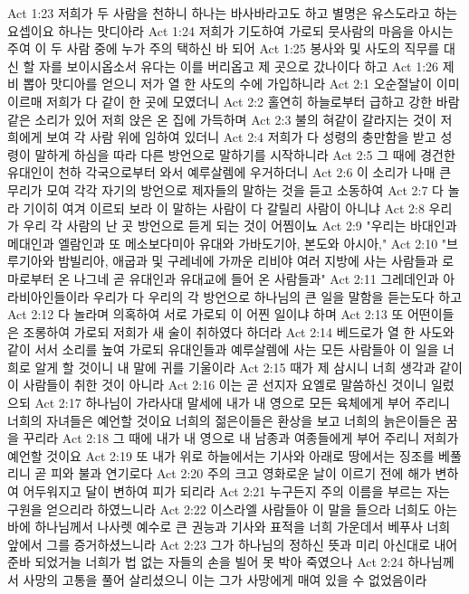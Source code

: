 Act 1:23  저희가 두 사람을 천하니 하나는 바사바라고도 하고 별명은 유스도라고 하는 요셉이요 하나는 맛디아라
Act 1:24  저희가 기도하여 가로되 뭇사람의 마음을 아시는 주여 이 두 사람 중에 누가 주의 택하신 바 되어
Act 1:25  봉사와 및 사도의 직무를 대신 할 자를 보이시옵소서 유다는 이를 버리옵고 제 곳으로 갔나이다 하고
Act 1:26  제비 뽑아 맛디아를 얻으니 저가 열 한 사도의 수에 가입하니라
Act 2:1  오순절날이 이미 이르매 저희가 다 같이 한 곳에 모였더니
Act 2:2  홀연히 하늘로부터 급하고 강한 바람 같은 소리가 있어 저희 앉은 온 집에 가득하며
Act 2:3  불의 혀같이 갈라지는 것이 저희에게 보여 각 사람 위에 임하여 있더니
Act 2:4  저희가 다 성령의 충만함을 받고 성령이 말하게 하심을 따라 다른 방언으로 말하기를 시작하니라
Act 2:5  그 때에 경건한 유대인이 천하 각국으로부터 와서 예루살렘에 우거하더니
Act 2:6  이 소리가 나매 큰 무리가 모여 각각 자기의 방언으로 제자들의 말하는 것을 듣고 소동하여
Act 2:7  다 놀라 기이히 여겨 이르되 보라 이 말하는 사람이 다 갈릴리 사람이 아니냐
Act 2:8  우리가 우리 각 사람의 난 곳 방언으로 듣게 되는 것이 어찜이뇨
Act 2:9  "우리는 바대인과 메대인과 엘람인과 또 메소보다미아 유대와 가바도기아, 본도와 아시아,"
Act 2:10  "브루기아와 밤빌리아, 애굽과 및 구레네에 가까운 리비야 여러 지방에 사는 사람들과 로마로부터 온 나그네 곧 유대인과 유대교에 들어 온 사람들과"
Act 2:11  그레데인과 아라비아인들이라 우리가 다 우리의 각 방언으로 하나님의 큰 일을 말함을 듣는도다 하고
Act 2:12  다 놀라며 의혹하여 서로 가로되 이 어찐 일이냐 하며
Act 2:13  또 어떤이들은 조롱하여 가로되 저희가 새 술이 취하였다 하더라
Act 2:14  베드로가 열 한 사도와 같이 서서 소리를 높여 가로되 유대인들과 예루살렘에 사는 모든 사람들아 이 일을 너희로 알게 할 것이니 내 말에 귀를 기울이라
Act 2:15  때가 제 삼시니 너희 생각과 같이 이 사람들이 취한 것이 아니라
Act 2:16  이는 곧 선지자 요엘로 말씀하신 것이니 일렀으되
Act 2:17  하나님이 가라사대 말세에 내가 내 영으로 모든 육체에게 부어 주리니 너희의 자녀들은 예언할 것이요 너희의 젊은이들은 환상을 보고 너희의 늙은이들은 꿈을 꾸리라
Act 2:18  그 때에 내가 내 영으로 내 남종과 여종들에게 부어 주리니 저희가 예언할 것이요
Act 2:19  또 내가 위로 하늘에서는 기사와 아래로 땅에서는 징조를 베풀리니 곧 피와 불과 연기로다
Act 2:20  주의 크고 영화로운 날이 이르기 전에 해가 변하여 어두워지고 달이 변하여 피가 되리라
Act 2:21  누구든지 주의 이름을 부르는 자는 구원을 얻으리라 하였느니라
Act 2:22  이스라엘 사람들아 이 말을 들으라 너희도 아는바에 하나님께서 나사렛 예수로 큰 권능과 기사와 표적을 너희 가운데서 베푸사 너희 앞에서 그를 증거하셨느니라
Act 2:23  그가 하나님의 정하신 뜻과 미리 아신대로 내어준바 되었거늘 너희가 법 없는 자들의 손을 빌어 못 박아 죽였으나
Act 2:24  하나님께서 사망의 고통을 풀어 살리셨으니 이는 그가 사망에게 매여 있을 수 없었음이라

